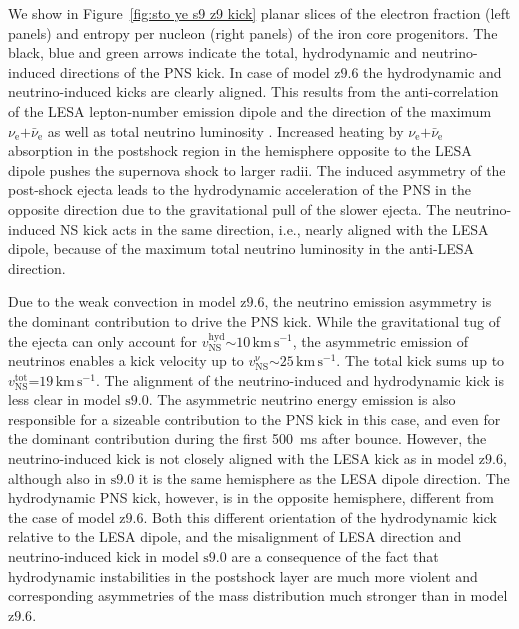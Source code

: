 \documentclass[fleqn,usenatbib]{mnras}
\newcommand{\kms}{\ensuremath{\mathrm{km\, s^{-1}}}}
\newcommand{\snine}{\ensuremath{\mathrm{s9.0}}\xspace}
\newcommand{\znine}{\ensuremath{\mathrm{z9.6}}\xspace}
\begin{document}
We show in Figure~\ref{fig:sto ye s9 z9 kick} planar slices of the electron fraction 
(left panels) and entropy per nucleon (right panels) of the iron core progenitors. The black, blue 
and green arrows indicate the total, hydrodynamic and neutrino-induced directions of the 
PNS kick. In case of model \znine the hydrodynamic and neutrino-induced kicks are clearly 
aligned. This results from the anti-correlation of the LESA lepton-number emission
dipole and the direction of the maximum $\nu_{\mathrm{e}}\mathord{+}\bar{\nu}_{\mathrm{e}}$ as
well as total neutrino luminosity \citep{Tamborra2014}. Increased 
heating by $\nu_{\mathrm{e}}\mathord{+}\bar{\nu}_{\mathrm{e}}$ absorption in the postshock region
in the hemisphere opposite to the LESA dipole pushes the supernova shock to larger 
radii. The induced asymmetry of the post-shock ejecta leads to the hydrodynamic 
acceleration of the PNS in the opposite direction due to the gravitational pull
of the slower ejecta. The neutrino-induced NS kick acts in the same direction, i.e.,
nearly aligned with the LESA dipole, because of the maximum total neutrino luminosity
in the anti-LESA direction.

Due to the weak convection in model \znine, the neutrino emission 
asymmetry is the dominant contribution to drive the PNS kick. 
While the gravitational tug of the ejecta can only account for  $v_{\mathrm{NS}}^{\mathrm{hyd}}\mathord{\sim}10\,\kms$, 
the asymmetric emission of neutrinos enables a kick velocity up to
$v_{\mathrm{NS}}^{\mathrm{\nu}}\mathord{\sim}25\,\kms$. 
The total kick sums up to $v_{\mathrm{NS}}^{\mathrm{tot}}\mathord{=}19\,\kms$.
The alignment of the neutrino-induced and hydrodynamic kick is less clear in model 
\snine. 
The asymmetric neutrino energy emission is also responsible for a sizeable contribution to the PNS
kick in this case, and even for the dominant contribution during the first 500~ms after bounce.
However, the neutrino-induced kick is not closely aligned with the LESA kick as in
model \znine, although also in \snine it is the same hemisphere as the LESA dipole direction.
The hydrodynamic PNS kick, however, is in the opposite hemisphere, different from the case of model 
\znine. Both this different orientation of the hydrodynamic kick relative to the LESA dipole, and the misalignment
of LESA direction and neutrino-induced kick in model \snine are a consequence of the fact that hydrodynamic
instabilities in the postshock layer are much more violent
and corresponding asymmetries of the mass distribution much stronger than in model \znine.
\end{document}
